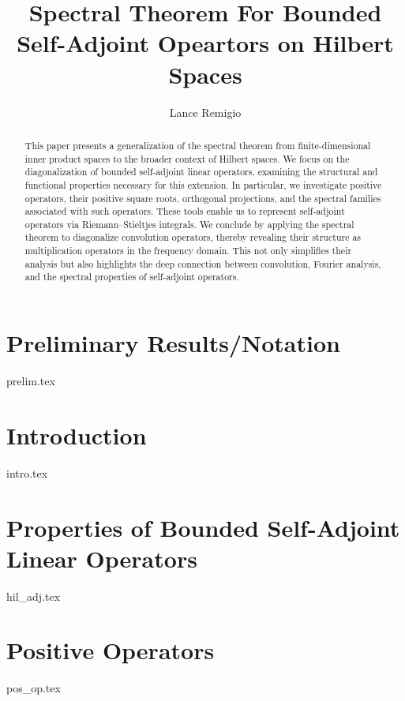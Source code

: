 \documentclass[a4paper]{article}
\title{Spectral Theorem For Bounded Self-Adjoint Opeartors on Hilbert Spaces}
\author{Lance Remigio}
\begin{document}
\maketitle
{}
\rhead{\thepage}
\tableofcontents

\begin{abstract}
This paper presents a generalization of the spectral theorem from finite-dimensional inner product spaces to the broader context of Hilbert spaces. We focus on the diagonalization of bounded self-adjoint linear operators, examining the structural and functional properties necessary for this extension. In particular, we investigate positive operators, their positive square roots, orthogonal projections, and the spectral families associated with such operators. These tools enable us to represent self-adjoint operators via Riemann–Stieltjes integrals. We conclude by applying the spectral theorem to diagonalize convolution operators, thereby revealing their structure as multiplication operators in the frequency domain. This not only simplifies their analysis but also highlights the deep connection between convolution, Fourier analysis, and the spectral properties of self-adjoint operators.
\end{abstract}

\section{Preliminary Results/Notation}

{prelim.tex}

\section{Introduction}\label{section 2}

{intro.tex}

\section{Properties of Bounded Self-Adjoint Linear Operators}\label{section 3}

{hil_adj.tex}

\section{Positive Operators}\label{section 4}

{pos_op.tex}
\end{document}
